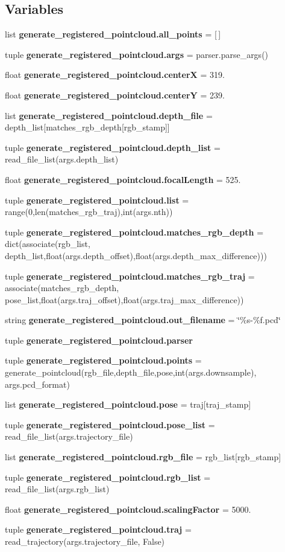 \subsection*{\-Variables}
\begin{DoxyCompactItemize}
\item 
list {\bf generate\-\_\-registered\-\_\-pointcloud.\-all\-\_\-points} = [$\,$]
\item 
tuple {\bf generate\-\_\-registered\-\_\-pointcloud.\-args} = parser.\-parse\-\_\-args()
\item 
float {\bf generate\-\_\-registered\-\_\-pointcloud.\-center\-X} = 319.
\item 
float {\bf generate\-\_\-registered\-\_\-pointcloud.\-center\-Y} = 239.
\item 
list {\bf generate\-\_\-registered\-\_\-pointcloud.\-depth\-\_\-file} = depth\-\_\-list[matches\-\_\-rgb\-\_\-depth[rgb\-\_\-stamp]]
\item 
tuple {\bf generate\-\_\-registered\-\_\-pointcloud.\-depth\-\_\-list} = read\-\_\-file\-\_\-list(args.\-depth\-\_\-list)
\item 
float {\bf generate\-\_\-registered\-\_\-pointcloud.\-focal\-Length} = 525.
\item 
tuple {\bf generate\-\_\-registered\-\_\-pointcloud.\-list} = range(0,len(matches\-\_\-rgb\-\_\-traj),int(args.\-nth))
\item 
tuple {\bf generate\-\_\-registered\-\_\-pointcloud.\-matches\-\_\-rgb\-\_\-depth} = dict(associate(rgb\-\_\-list, depth\-\_\-list,float(args.\-depth\-\_\-offset),float(args.\-depth\-\_\-max\-\_\-difference)))
\item 
tuple {\bf generate\-\_\-registered\-\_\-pointcloud.\-matches\-\_\-rgb\-\_\-traj} = associate(matches\-\_\-rgb\-\_\-depth, pose\-\_\-list,float(args.\-traj\-\_\-offset),float(args.\-traj\-\_\-max\-\_\-difference))
\item 
string {\bf generate\-\_\-registered\-\_\-pointcloud.\-out\-\_\-filename} = \char`\"{}\%s-\/\%f.\-pcd\char`\"{}
\item 
tuple {\bf generate\-\_\-registered\-\_\-pointcloud.\-parser}
\item 
tuple {\bf generate\-\_\-registered\-\_\-pointcloud.\-points} = generate\-\_\-pointcloud(rgb\-\_\-file,depth\-\_\-file,pose,int(args.\-downsample), args.\-pcd\-\_\-format)
\item 
list {\bf generate\-\_\-registered\-\_\-pointcloud.\-pose} = traj[traj\-\_\-stamp]
\item 
tuple {\bf generate\-\_\-registered\-\_\-pointcloud.\-pose\-\_\-list} = read\-\_\-file\-\_\-list(args.\-trajectory\-\_\-file)
\item 
list {\bf generate\-\_\-registered\-\_\-pointcloud.\-rgb\-\_\-file} = rgb\-\_\-list[rgb\-\_\-stamp]
\item 
tuple {\bf generate\-\_\-registered\-\_\-pointcloud.\-rgb\-\_\-list} = read\-\_\-file\-\_\-list(args.\-rgb\-\_\-list)
\item 
float {\bf generate\-\_\-registered\-\_\-pointcloud.\-scaling\-Factor} = 5000.
\item 
tuple {\bf generate\-\_\-registered\-\_\-pointcloud.\-traj} = read\-\_\-trajectory(args.\-trajectory\-\_\-file, \-False)
\end{DoxyCompactItemize}
